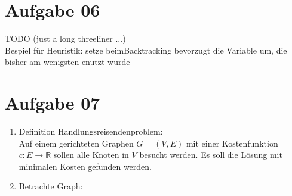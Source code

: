 \documentclass[10pt,a4paper]{article}
\begin{document}
\section*{Aufgabe 06}
    TODO (just a long threeliner ...)\\
    Bespiel für Heuristik: setze beimBacktracking bevorzugt die
    Variable um, die bisher am wenigsten enutzt wurde
    
\section*{Aufgabe 07}
    \begin{enumerate}[label={\alph*)}]
        \item Definition Handlungsreisendenproblem: \\
            Auf einem gerichteten Graphen $G = (V,E)$ mit einer
            Kostenfunktion $c: E \rightarrow \mathbb{R}$
            sollen alle Knoten in $V$ 
            besucht werden. Es soll die L\"osung mit minimalen Kosten
            gefunden werden.
        \item Betrachte Graph: \\
            \begin{figure}[H]
                \centering
                \def\svgwidth{\columnwidth}
\end{figure}
\end{enumerate}
\end{document}
